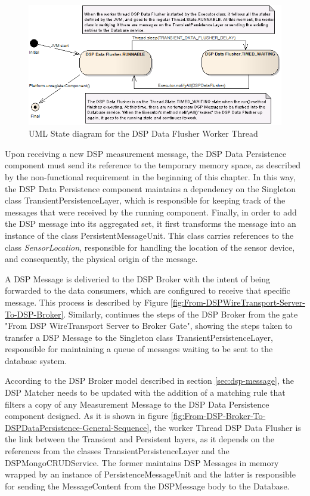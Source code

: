\begin{figure}[!b]
  \centering
  \includegraphics[scale=0.5]{../diagrams/DSP-DataPersistence-Flusher-State-Diagram}
  \caption{UML State diagram for the DSP Data Flusher Worker Thread}
  \label{fig:DSP-DataPersistence-Flusher-State-Diagram}
\end{figure}

Upon receiving a new DSP measurement message, the DSP Data Persistence
component must send its reference to the temporary memory space, as described
by the non-functional requirement in the beginning of this chapter. In this
way, the DSP Data Persistence component maintains a dependency on the Singleton
class TransientPersistenceLayer, which is responsible for keeping track of the
messages that were received by the running component. Finally, in order to add
the DSP message into its aggregated set, it first transforms the message into an
instance of the class PersistentMessageUnit. This class carries references to
the class \emph{SensorLocation}, responsible for handling the location of the
sensor device, and consequently, the physical origin of the message.

A DSP Message is deliveried to the DSP Broker with the intent of being
forwarded to the data consumers, which are configured to receive that
specific message. This process is described by Figure
\ref{fig:From-DSPWireTransport-Server-To-DSP-Broker}. Similarly, continues the
steps of the DSP Broker from the gate "From DSP WireTransport Server to Broker
Gate", showing the steps taken to transfer a DSP Message to the Singleton
class TransientPersistenceLayer, responsible for maintaining a queue of
messages waiting to be sent to the database system.

According to the DSP Broker model described in section \ref{sec:dsp-message}, 
the DSP Matcher needs to be updated with the addition of a matching rule that
filters a copy of any Measurement Message to the DSP Data Persistence component
designed. As it is shown in figure
\ref{fig:From-DSP-Broker-To-DSPDataPersistence-General-Sequence}, the worker
Thread DSP Data Flusher is the link between the Transient and Persistent
layers, as it depends on the references from the classes
TransientPersistenceLayer and the DSPMongoCRUDService. The former maintains
DSP Messages in memory wrapped by an instance of PersistenceMessageUnit and
the latter is responsible for sending the MessageContent from the DSPMessage
body to the Database.

